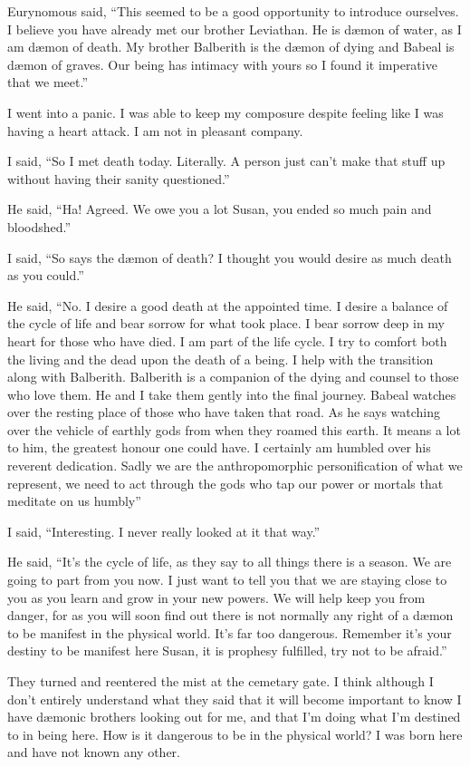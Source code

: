 Eurynomous said, ``This seemed to be a good opportunity to introduce ourselves. I believe you have already met our brother Leviathan. He is d\ae mon of water, as I am d\ae mon of death. My brother Balberith is the d\ae mon of dying and Babeal is d\ae mon of graves. Our being has intimacy with yours so I found it imperative that we meet.''

I went into a panic. I was able to keep my composure despite feeling like I was having a heart attack. I am not in pleasant company.

I said, ``So I met death today. Literally. A person just can't make that stuff up without having their sanity questioned.''

He said, ``Ha! Agreed. We owe you a lot Susan, you ended so much pain and bloodshed.''

I said, ``So says the d\ae mon of death? I thought you would desire as much death as you could.''

He said, ``No. I desire a good death at the appointed time. I desire a balance of the cycle of life and bear sorrow for what took place. I bear sorrow deep in my heart for those who have died. I am part of the life cycle. I try to comfort both the living and the dead upon the death of a being. I help with the transition along with Balberith. Balberith is a companion of the dying and counsel to those who love them. He and I take them gently into the final journey. Babeal watches over the resting place of those who have taken that road. As he says watching over the vehicle of earthly gods from when they roamed this earth. It means a lot to him, the greatest honour one could have. I certainly am humbled over his reverent dedication. Sadly we are the anthropomorphic personification of what we represent, we need to act through the gods who tap our power or mortals that meditate on us humbly''

I said, ``Interesting. I never really looked at it that way.''

He said, ``It's the cycle of life, as they say to all things there is a season. We are going to part from you now. I just want to tell you that we are staying close to you as you learn and grow in your new powers. We will help keep you from danger, for as you will soon find out there is not normally any right of a d\ae mon to be manifest in the physical world. It's far too dangerous. Remember it's your destiny to be manifest here Susan, it is prophesy fulfilled, try not to be afraid.''

They turned and reentered the mist at the cemetary gate. I think although I don't entirely understand what they said that it will become important to know I have d\ae monic brothers looking out for me, and that I'm doing what I'm destined to in being here. How is it dangerous to be in the physical world? I was born here and have not known any other.

